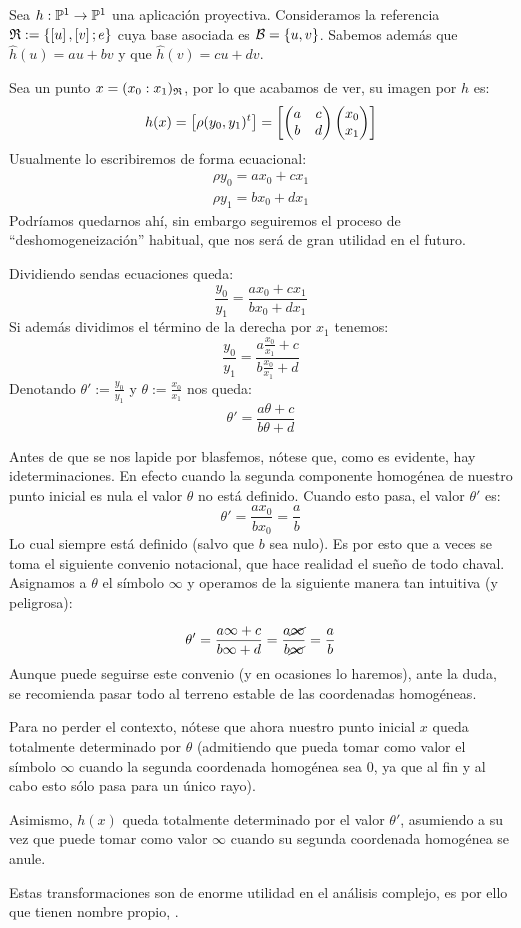 \begin{exa}
	\label{C4_exa_mobius}
	Sea $h:\mathbb{P}^1\to\mathbb{P}^1$ una aplicación proyectiva. Consideramos la referencia $\mathfrak{R}:=\{\left [ u \right ],\left [ v \right ];e\}$ cuya base asociada es $\mathcal{B}=\{u,v\}$. Sabemos además que $\widehat{h}(u)=au+bv$ y que $\widehat{h}(v)=cu+dv$.
	
	Sea un punto $x=(x_0:x_1)_{\mathfrak{R}}$, por lo que acabamos de ver, su imagen por $h$ es:
	\[h(x)=\left [ \rho(y_0,y_1)^t \right ]=\left [ \begin{pmatrix}
	a & c\\
	b & d
	\end{pmatrix}\begin{pmatrix}
	x_0\\
	x_1
	\end{pmatrix} \right ]\]
	Usualmente lo escribiremos de forma ecuacional:
	\[\begin{array}{l}
	\rho y_0 = ax_0+cx_1\\
	\rho y_1 = bx_0+dx_1
	\end{array}\]
	Podríamos quedarnos ahí, sin embargo seguiremos el proceso de ``deshomogeneización'' habitual, que nos será de gran utilidad en el futuro.
	
	Dividiendo sendas ecuaciones queda:
	\[\frac{y_0}{y_1}=\frac{ax_0+cx_1}{bx_0+dx_1}\]
	Si además dividimos el término de la derecha por $x_1$ tenemos:
	\[\frac{y_0}{y_1}=\frac{a\frac{x_0}{x_1}+c}{b\frac{x_0}{x_1}+d}\]
	Denotando $\theta':=\frac{y_0}{y_1}$ y $\theta:=\frac{x_0}{x_1}$ nos queda:
	\[\theta'=\frac{a\theta+c}{b\theta+d}\]
	
	Antes de que se nos lapide por blasfemos, nótese que, como es evidente, hay ideterminaciones. En efecto cuando la segunda componente homogénea de nuestro punto inicial es nula el valor $\theta$ no está definido. Cuando esto pasa, el valor $\theta'$ es:
	\[\theta'=\frac{ax_0}{bx_0}=\frac{a}{b}\]
	Lo cual siempre está definido (salvo que $b$ sea nulo). Es por esto que a veces se toma el siguiente convenio notacional, que hace realidad el sueño de todo chaval. Asignamos a $\theta$ el símbolo $\infty$ y operamos de la siguiente manera tan intuitiva (y peligrosa):
	
	\[\theta'=\frac{a\infty+c}{b\infty+d}=\frac{a\cancel{\infty}}{b\cancel{\infty}}=\frac{a}{b}\]
	Aunque puede seguirse este convenio (y en ocasiones lo haremos), ante la duda, se recomienda pasar todo al terreno estable de las coordenadas homogéneas.
	
	Para no perder el contexto, nótese que ahora nuestro punto inicial $x$ queda totalmente determinado por $\theta$ (admitiendo que pueda tomar como valor el símbolo $\infty$ cuando la segunda coordenada homogénea sea $0$, ya que al fin y al cabo esto sólo pasa para un único rayo).
	
	Asimismo, $h(x)$ queda totalmente determinado por el valor $\theta'$, asumiendo a su vez que puede tomar como valor $\infty$ cuando su segunda coordenada homogénea se anule.
	
	Estas transformaciones son de enorme utilidad en el análisis complejo, es por ello que tienen nombre propio, .
\end{exa}
